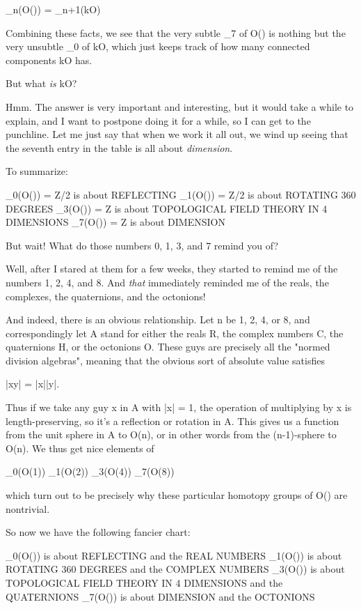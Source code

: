 \pi _{n}(O(\infty )) = \pi _{n+1}(kO)

Combining these facts, we see that the very subtle \pi _{7} of O(\infty )
is nothing but the very unsubtle \pi _{0} of kO, which just
keeps track of how many connected components kO has.

But what \emph{is} kO?   

Hmm.  The answer is very important and interesting, but it would
take a while to explain, and I want to postpone doing it for a while,
so I can get to the punchline.  Let me just say that when we work
it all out, we wind up seeing that the seventh entry in the table
is all about \emph{dimension}.  

To summarize: 

\pi _{0}(O(\infty )) = Z/2  is about REFLECTING
\pi _{1}(O(\infty )) = Z/2  is about ROTATING 360 DEGREES
\pi _{3}(O(\infty )) = Z    is about TOPOLOGICAL FIELD THEORY IN 4 DIMENSIONS
\pi _{7}(O(\infty )) = Z    is about DIMENSION

But wait!  What do those numbers 0, 1, 3, and 7 remind you of?  

Well, after I stared at them for a few weeks, they started to remind
me of the numbers 1, 2, 4, and 8.  And \emph{that} immediately reminded me
of the reals, the complexes, the quaternions, and the octonions!  

And indeed, there is an obvious relationship.  Let n be 1, 2, 4, or 8,
and correspondingly let A stand for either the reals R, the complex
numbers C, the quaternions H, or the octonions O.  These guys are
precisely all the "normed division algebras", meaning that the obvious
sort of absolute value satisfies

|xy| = |x||y|.

Thus if we take any guy x in A with |x| = 1, the operation
of multiplying by x is length-preserving, so it's a reflection or 
rotation in A.  This gives us a function from the unit sphere in
A to O(n), or in other words from the (n-1)-sphere to O(n).  We thus
get nice elements of

\pi _{0}(O(1))
\pi _{1}(O(2))
\pi _{3}(O(4))
\pi _{7}(O(8))

which turn out to be precisely why these particular homotopy groups
of O(\infty ) are nontrivial.

So now we have the following fancier chart:

\pi _{0}(O(\infty )) is about REFLECTING and the REAL NUMBERS
\pi _{1}(O(\infty )) is about ROTATING 360 DEGREES and the COMPLEX NUMBERS
\pi _{3}(O(\infty )) is about TOPOLOGICAL FIELD THEORY IN 4 DIMENSIONS and the
                           QUATERNIONS
\pi _{7}(O(\infty )) is about DIMENSION and the OCTONIONS

